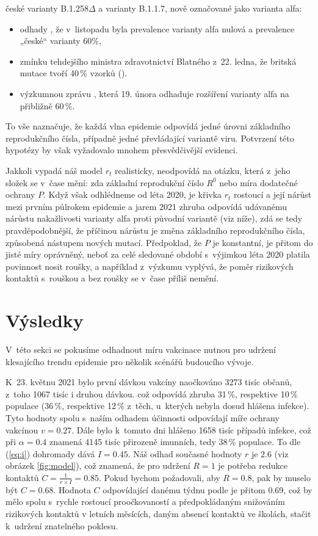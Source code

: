 české varianty B.1.258$\Delta$ a varianty B.1.1.7, nově označované jako varianta alfa:
\begin{itemize}
\item odhady \cite{brejova2021b}, že v~listopadu byla
prevalence varianty alfa nulová a prevalence „české“ varianty 60\%, 
\item zmínku tehdejšího ministra zdravotnictví Blatného z~22. ledna, že britská mutace tvoří 40\,\% vzorků (\cite{blatnybrigit}).
\item výzkumnou zprávu \cite{diana}, která 19. února odhaduje rozšíření varianty alfa
na přibližně 60\,\%.
\end{itemize}
To vše naznačuje, že každá vlna epidemie odpovídá jedné úrovni základního reprodukčního čísla, případně jedné převládající variantě viru. Potvrzení této hypotézy by však vyžadovalo
mnohem přesvědčivější evidenci.

Jakkoli vypadá náš model $r_t$ realisticky, neodpovídá na otázku, která z~jeho složek se v~čase mění: zda základní reprodukční číslo $R^0$ nebo míra dodatečné ochrany $P$. Když však odhlédneme od léta 2020, je křivka $r_t$ rostoucí a její nárůst mezi prvním půlrokem epidemie a jarem 2021 zhruba odpovídá udávanému nárůstu nakažlivosti varianty alfa proti původní variantě (viz níže), zdá se tedy pravděpodobnější, že příčinou nárůstu je změna základního reprodukčního čísla, způsobená nástupem nových mutací. Předpoklad, že $P$ je konstantní, je přitom do jisté míry 
oprávněný, neboť za celé sledované období s~výjimkou léta
2020 platila povinnost nosit roušky, a například z~výzkumu \cite{paqcovid}
vyplývá, že poměr rizikových kontaktů s~rouškou a bez roušky se
v~čase příliš nemění. 

\section*{Výsledky}

V~této sekci se pokusíme odhadnout míru vakcinace nutnou pro udržení
klesajícího trendu epidemie pro několik scénářů budoucího vývoje. 

K~23. květnu 2021 bylo první dávkou vakcíny naočkováno 3273 tisíc
občanů, z~toho 1067 tisíc i druhou dávkou. což odpovídá zhruba 31\,\%,
respektive 10\,\% populace (36\,\%, respektive 12\,\% z~těch, u~kterých nebyla
dosud hlášena infekce). Tyto hodnoty spolu s~naším odhadem účinnosti
odpovídají míře ochrany vakcínou $v=0.27$. Dále bylo k~tomuto dni
hlášeno 1658 tisíc případů infekce, což při $\alpha=0.4$ znamená
4145 tisíc přirozeně imunních, tedy 38\,\% populace. To dle (\ref{eq:i})
dohromady dává $I=0.45$. Náš odhad současné hodnoty $r$ je $2.6$ (viz obrázek \ref{fig:model}), což znamená, že pro udržení $R=1$ je potřeba redukce kontaktů
$C=\frac{1}{r\times I}=0.85$. Pokud bychom požadovali, aby $R=0.8$,
pak by muselo být $C=0.68$. Hodnota $C$ odpovídající danému týdnu
podle \cite{paqcovid} je přitom 0.69, což by mělo spolu
s~rychle rostoucí proočkovaností a předpokládaným snižováním rizikových kontaktů v letních měsících, daným absencí kontaktů ve školách, stačit k~udržení znatelného poklesu.

